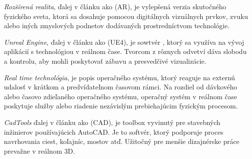 \documentclass[10pt,twoside,slovak,a4paper]{article}
\begin{document}
\emph{Rozšírená realita}, ďalej v článku ako (AR), je vylepšená verzia skutočného fyzického sveta, ktorá sa dosahuje pomocou digitálnych vizuálnych prvkov, zvuku alebo iných zmyslových podnetov dodávaných prostredníctvom technológie.\vspace{5mm}\cite{joebardie_2020}

\emph{Unreal Engine}, ďalej v článku ako (UE4), je sowtvér , ktorý sa využíva na  vývoj aplikácií s technológiou v reálnom čase. Tvorcom z rôznych odvetví dáva slobodu a kontrolu, aby mohli poskytovať zábavu a presvedčivé vizualizácie.\vspace{5mm}

\emph{Real time technológia}, je popis operačného systému, ktorý reaguje na externú udalosť v krátkom a predvídateľnom časovom rámci. Na rozdiel od dávkového alebo časovo zdieľaného operačného systému, operačný systém v reálnom čase poskytuje služby alebo riadenie nezávislým prebiehajúcim fyzickým procesom.\vspace{5mm}

\emph{CadTools} ďalej v článku ako (CAD), je toolbox vyvinutý pre stavebných inžinierov používajúcich AutoCAD. Je to softvér, ktorý podporuje proces navrhovania ciest, koľajníc, mostov atď. Užitočný pre menšie dizajnérske práce prevažne v reálnom 3D.\vspace{5mm}
\end{document}
